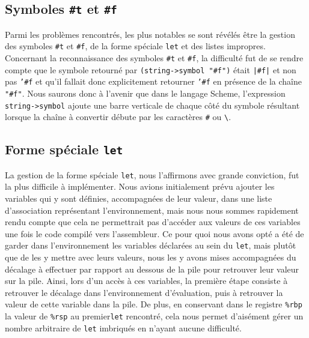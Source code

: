 \documentclass[12pt]{article}
\begin{document}
\subsection{Symboles \texttt{\#t} et \texttt{\#f}}
Parmi les problèmes rencontrés, les plus notables se sont révélés être la gestion des symboles \texttt{\#t} et \texttt{\#f}, de la forme spéciale \texttt{let} et des listes impropres. Concernant la reconnaissance des symboles \texttt{\#t} et \texttt{\#f}, la difficulté fut de se rendre compte que le symbole retourné par \texttt{(string->symbol "\#f")} était \texttt{|\#f|} et non pas \texttt{'\#f} et qu'il fallait donc explicitement retourner \texttt{'\#f} en présence de la chaîne \texttt{"\#f"}. Nous saurons donc à l'avenir que dans le langage Scheme, l'expression \texttt{string->symbol} ajoute une barre verticale de chaque côté du symbole résultant lorsque la chaîne à convertir débute par les caractères \texttt{\#} ou \texttt{\textbackslash}.

\subsection{Forme spéciale \texttt{let}}
La gestion de la forme spéciale \texttt{let}, nous l'affirmons avec grande conviction, fut la plus difficile à implémenter. Nous avions initialement prévu ajouter les variables qui y sont définies, accompagnées de leur valeur, dans une liste d'association représentant l'environnement, mais nous nous sommes rapidement rendu compte que cela ne permettrait pas d'accéder aux valeurs de ces variables une fois le code compilé vers l'assembleur. Ce pour quoi nous avons opté a été de garder dans l'environnement les variables déclarées au sein du  \texttt{let}, mais plutôt que de les y mettre avec leurs valeurs, nous les y avons mises accompagnées du décalage à effectuer par rapport au dessous de la pile pour retrouver leur valeur sur la pile. Ainsi, lors d'un accès à ces variables, la première étape consiste à retrouver le décalage dans l'environnement d'évaluation, puis à retrouver la valeur de cette variable dans la pile. De plus, en conservant dans le registre \texttt{\%rbp} la valeur de \texttt{\%rsp} au premier\texttt{let} rencontré, cela nous permet d'aisément gérer un nombre arbitraire de \texttt{let} imbriqués en n'ayant aucune difficulté.
\end{document}
